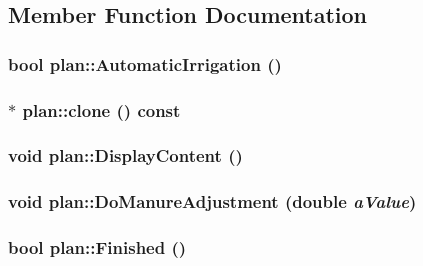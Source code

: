 \subsection{Member Function Documentation}
\hypertarget{classplan_a44d27c54c440253db2ce50369826b3cf}{
\subsubsection[{AutomaticIrrigation}]{\setlength{\rightskip}{0pt plus 5cm}bool plan::AutomaticIrrigation ()}}
\label{classplan_a44d27c54c440253db2ce50369826b3cf}
\hypertarget{classplan_a1734515ada7c0e24914487ddf59268dc}{
\subsubsection[{clone}]{ $\ast$ plan::clone () const}}
\label{classplan_a1734515ada7c0e24914487ddf59268dc}
\hypertarget{classplan_acc3eb4e92df8fa1142fb2885c15d35de}{
\subsubsection[{DisplayContent}]{\setlength{\rightskip}{0pt plus 5cm}void plan::DisplayContent ()}}
\label{classplan_acc3eb4e92df8fa1142fb2885c15d35de}
\hypertarget{classplan_a1c083fe4c2f06097b7b57daf985996f1}{
\subsubsection[{DoManureAdjustment}]{\setlength{\rightskip}{0pt plus 5cm}void plan::DoManureAdjustment (double {\em aValue})}}
\label{classplan_a1c083fe4c2f06097b7b57daf985996f1}
\hypertarget{classplan_a336d1b751be876cf584e47d44826d8ac}{
\subsubsection[{Finished}]{\setlength{\rightskip}{0pt plus 5cm}bool plan::Finished ()}}
